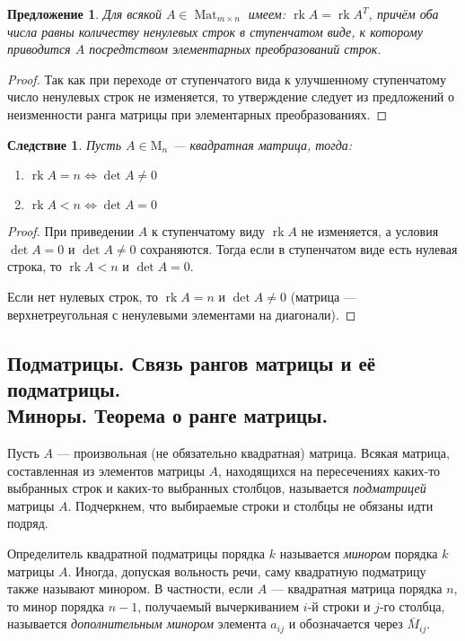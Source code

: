 \documentclass[a4paper, 12pt]{article}
\DeclareMathOperator{\Mat}{Mat}
\DeclareMathOperator{\rk}{rk}
\newtheorem*{base_44-cons}{Следствие}
\newtheorem*{proposal}{Предложение}
\begin{document}
\begin{proposal}
\textit{Для всякой $A \in \Mat_{m \times n}$ имеем: $\rk A = \rk A^T$, причём оба числа равны количеству ненулевых строк в ступенчатом виде, к которому приводится $A$ посредтством элементарных преобразований строк.}
\end{proposal}
\begin{proof}
Так как при переходе от ступенчатого вида к улучшенному ступенчатому число ненулевых строк не изменяется, то утверждение следует из предложений о неизменности ранга матрицы при элементарных преобразованиях.
\end{proof}

\begin{base_44-cons}
Пусть $A \in \mathrm{M}_n$ --- квадратная матрица, тогда:
\begin{enumerate}
\item $\rk A = n \iff \det A \neq 0$
\item $\rk A < n \iff \det A = 0$
\end{enumerate}
\end{base_44-cons}
\begin{proof}
При приведении $A$ к ступенчатому виду $\rk A$ не изменяется, а условия $\det A = 0$ и $\det A \neq 0$ сохраняются. Тогда если в ступенчатом виде есть нулевая строка, то $\rk A < n$ и $\det A = 0$.

Если нет нулевых строк, то $\rk A = n$ и $\det A \neq 0$ (матрица --- верхнетреугольная с ненулевыми элементами на диагонали).
\end{proof}


\subsection{Подматрицы. Связь рангов матрицы и её подматрицы. \\Миноры. Теорема о ранге матрицы.}
Пусть $A$ — произвольная (не обязательно квадратная) матрица. Всякая матрица, составленная из элементов матрицы $A$, находящихся на пересечениях каких-то выбранных строк и каких-то выбранных столбцов, называется \textit{подматрицей} матрицы $A$. Подчеркнем, что выбираемые строки и столбцы не обязаны идти подряд.

Определитель квадратной подматрицы порядка $k$ называется \textit{минором} порядка $k$ матрицы $A$. Иногда, допуская вольность речи, саму квадратную подматрицу также называют минором. В частности, если $A$ — квадратная матрица порядка $n$, то минор порядка $n-1$, получаемый вычеркиванием $i$-й строки и $j$-го столбца, называется \textit{дополнительным минором} элемента $a_{ij}$ и обозначается через $\bar{M}_{ij}$.
\end{document}
